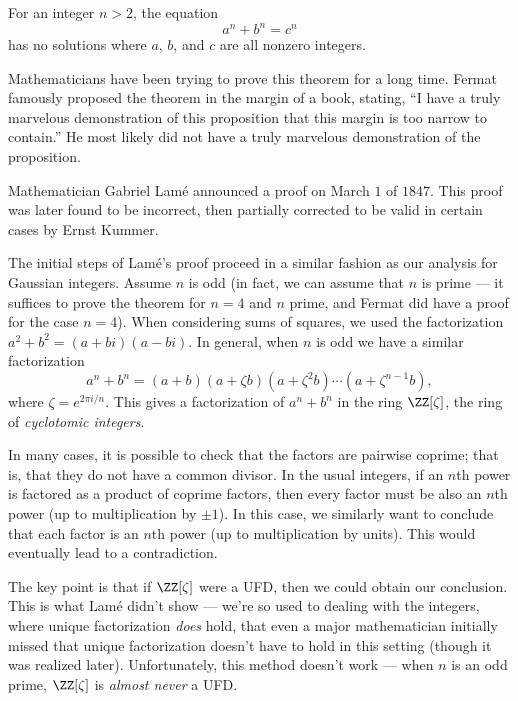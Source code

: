 \begin{theorem}[Fermat]
For an integer $n > 2$, the equation \[a^n + b^n = c^n\] has no solutions where $a$, $b$, and $c$ are all nonzero integers.  
\end{theorem}

Mathematicians have been trying to prove this theorem for a long time. Fermat famously proposed the theorem in the margin of a book, stating, ``I have a truly marvelous demonstration of this proposition that this margin is too narrow to contain.'' He most likely did not have a truly marvelous demonstration of the proposition. 

Mathematician Gabriel Lam\'e announced a proof on March $1$ of $1847$. This proof was later found to be incorrect, then partially corrected to be valid in certain cases by Ernst Kummer.

The initial steps of Lam\'e's proof proceed in a similar fashion as our analysis for Gaussian integers. Assume $n$ is odd (in fact, we can assume that $n$ is prime --- it suffices to prove the theorem for $n = 4$ and $n$ prime, and Fermat did have a proof for the case $n = 4$). When considering sums of squares, we used the factorization $a^2 + b^2 = (a + bi)(a - bi)$. In general, when $n$ is odd we have a similar factorization \[a^n + b^n = (a + b)(a + \zeta b)(a + \zeta^2 b) \cdots (a + \zeta^{n - 1}b),\] where $\zeta = e^{2\pi i/n}$. This gives a factorization of $a^n + b^n$ in the ring $\ZZ[\zeta]$, the ring of \emph{cyclotomic integers}.  

In many cases, it is possible to check that the factors are pairwise coprime; that is, that they do not have a common divisor. In the usual integers, if an $n$th power is factored as a product of coprime factors, then every factor must be also an $n$th power (up to multiplication by $\pm 1$). In this case, we similarly want to conclude that each factor is an $n$th power (up to multiplication by units). This would eventually lead to a contradiction. %

The key point is that if $\ZZ[\zeta]$ were a UFD, then we could obtain our conclusion. This is what Lam\'e didn't show --- we're so used to dealing with the integers, where unique factorization \emph{does} hold, that even a major mathematician initially missed that unique factorization doesn't have to hold in this setting (though it was realized later). Unfortunately, this method doesn't work --- when $n$ is an odd prime, $\ZZ[\zeta]$ is \emph{almost never} a UFD. 

